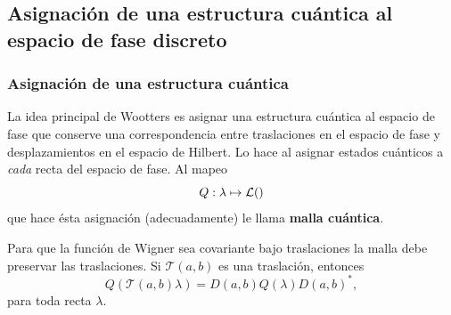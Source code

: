 \documentclass[10pt, spanish]{beamer}
\let\H\relax
\DeclareMathOperator{\H}{\mathcal H}
\begin{document}
  \subsection{Asignación de una estructura cuántica al
  espacio de fase discreto}

  \begin{frame}
    \frametitle{Asignación de una estructura cuántica}

    La idea principal de Wootters es asignar una estructura
    cuántica al espacio de fase que conserve una
    correspondencia entre traslaciones en el espacio de fase
    y desplazamientos en el espacio de Hilbert. Lo hace al
    asignar estados cuánticos a \textit{cada} recta del
    espacio de fase. Al mapeo 
    \[
      Q : \lambda \mapsto \mathcal L(\H)
    \]
    que hace ésta asignación (adecuadamente) le llama
    \textbf{malla cuántica}.

    \vspace{10pt}

    \pause

    Para que la función de Wigner sea covariante bajo
    traslaciones la malla debe preservar las traslaciones.
    Si $\mathcal T(a,b)$ es una traslación, entonces
    \begin{equation}
      Q\left( \mathcal T(a,b) \lambda \right) 
      =
      D(a,b) Q(\lambda) D(a,b)^{*},
    \end{equation}
    para toda recta $\lambda$.
  \end{frame}






\end{document}
